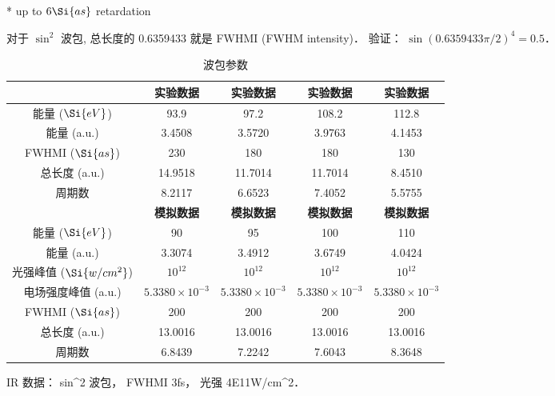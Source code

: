 
* up to $6 \Si{as}$ retardation

对于 $\sin^2$ 波包, 总长度的 0.6359433 就是 FWHMI (FWHM intensity)． 验证： $\sin(0.6359433 \pi/ 2)^4 = 0.5$．

\begin{table}[ht]
\centering
\caption{波包参数}\label{Osiand_tab1}
\begin{tabular}{|c|c|c|c|c|}
\hline
 & \textbf{实验数据} & \textbf{实验数据} & \textbf{实验数据} & \textbf{实验数据} \\
\hline
能量 ($\Si{eV}$) & 93.9 & 97.2 & 108.2 & 112.8 \\
\hline
能量 (a.u.) & 3.4508 & 3.5720 & 3.9763 & 4.1453 \\
\hline
FWHMI ($\Si{as}$) & 230 & 180 & 180 & 130 \\
\hline
总长度 (a.u.) & 14.9518 & 11.7014 & 11.7014 & 8.4510 \\
\hline
周期数 & 8.2117 & 6.6523 & 7.4052 & 5.5755\\
\hline
 & \textbf{模拟数据} & \textbf{模拟数据} & \textbf{模拟数据} & \textbf{模拟数据} \\
\hline
能量 ($\Si{eV}$) & 90 & 95 & 100 & 110 \\
\hline
能量 (a.u.) & 3.3074 & 3.4912 & 3.6749 & 4.0424\\
\hline
光强峰值 ($\Si{w/cm^2}$) & $10^{12}$ & $10^{12}$ & $10^{12}$ & $10^{12}$ \\
\hline
电场强度峰值 (a.u.) & $5.3380\times 10^{-3}$ & $5.3380\times 10^{-3}$ & $5.3380\times 10^{-3}$ & $5.3380\times 10^{-3}$\\
\hline
FWHMI ($\Si{as}$) & 200 & 200 & 200 & 200 \\
\hline
总长度 (a.u.) & 13.0016 & 13.0016 & 13.0016 & 13.0016 \\
\hline
周期数 & 6.8439 & 7.2242 & 7.6043 & 8.3648 \\
\hline
\end{tabular}
\end{table}

IR 数据： sin^2 波包， FWHMI 3fs， 光强 4E11W/cm^2．
